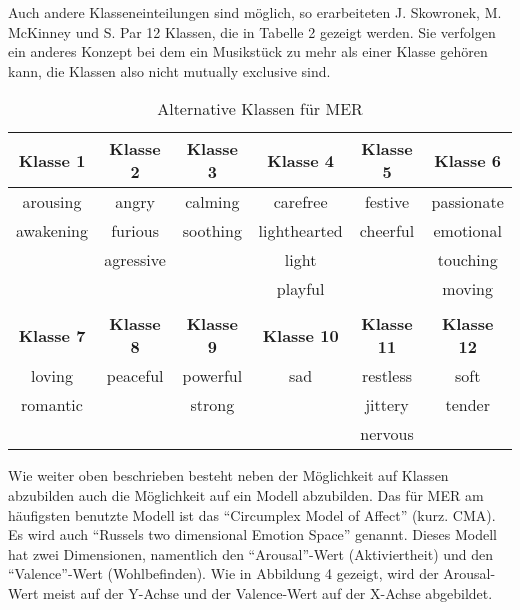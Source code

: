 \documentclass[11pt,a4paper]{article}
\begin{document}
Auch andere Klasseneinteilungen sind möglich, so erarbeiteten J. Skowronek, M. McKinney und S. Par  \cite{7cd5f337a4b030e3fafd0b4bc7e0976ff7cc1ec8c28d583c5dab695e0ee78941} 12 Klassen, die in Tabelle 2 gezeigt werden. Sie verfolgen ein anderes Konzept bei dem ein Musikstück zu mehr als einer Klasse gehören kann, die Klassen also nicht mutually exclusive sind.
\begin{center}
\begin{table}[h]
\begin{tabular}{c c c c c c}
\textbf{Klasse 1} & \textbf{Klasse 2} & \textbf{Klasse 3} & \textbf{Klasse 4} & \textbf{Klasse 5} & \textbf{Klasse 6} \\
\hline
arousing  & angry     & calming  & carefree     & festive  & passionate \\
awakening & furious   & soothing & lighthearted & cheerful & emotional \\
          & agressive &          & light        &          & touching    \\
          &           &          & playful      &          & moving      \\
\vspace{10pt}\\
\textbf{Klasse 7} & \textbf{Klasse 8} & \textbf{Klasse 9} & \textbf{Klasse 10} & \textbf{Klasse 11} & \textbf{Klasse 12}\\
\hline
loving   & peaceful & powerful & sad & restless & soft\\
romantic &          & strong   &     & jittery  & tender\\
         &          &          &     & nervous  & \\
\end{tabular}
\caption[Alternative Music Emotion Recognition Klassen]{Alternative Klassen für MER}
\end{table}
\end{center}
Wie weiter oben beschrieben besteht neben der Möglichkeit auf Klassen abzubilden auch die Möglichkeit auf ein Modell abzubilden. Das für MER am häufigsten benutzte Modell ist das ``Circumplex Model of Affect'' (kurz. CMA). Es wird auch ``Russels two dimensional Emotion Space'' genannt. Dieses Modell hat zwei Dimensionen, namentlich den ``Arousal''-Wert (Aktiviertheit) und den ``Valence''-Wert (Wohlbefinden). Wie in Abbildung 4 gezeigt, wird der Arousal-Wert meist auf der Y-Achse und der Valence-Wert auf der X-Achse abgebildet. \\
\end{document}
